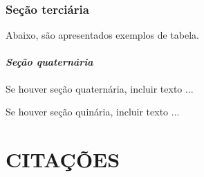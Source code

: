 \documentclass[
        oneside,      %
        english,			
        brazil			 
        ]{abntbibufjf}
\begin{document}
\subsection{\textbf{Se\c{c}\~ao terci\'aria}} %

Abaixo, s\~ao apresentados exemplos de tabela. 





\subsubsection{\textit{Se\c{c}\~ao quatern\'aria}} %

Se houver se\c{c}\~ao quatern\'aria, incluir texto ...


Se houver se\c{c}\~ao quin\'aria, incluir texto ...


\chapter{CITA\c{C}\~{O}ES} %
\end{document}
